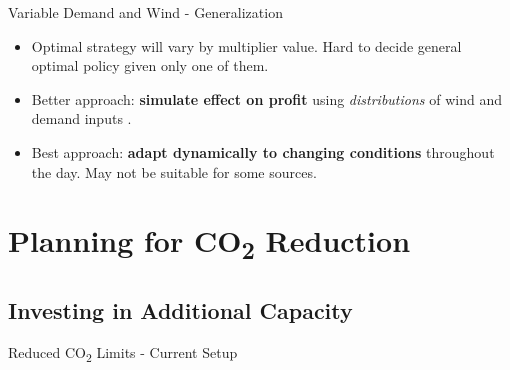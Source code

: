 \documentclass{beamer}
\begin{document}
    \begin{frame}{Variable Demand and Wind - Generalization}
    	
        	\begin{itemize}

                \item Optimal strategy will vary by multiplier value.  Hard to decide general optimal policy given only one of them.

                \item  Better approach: \textbf{simulate effect on profit} using \textit{distributions} of wind and demand inputs .

                \item Best approach: \textbf{adapt dynamically to changing conditions} throughout the day.  May not be suitable for some sources.  

			\end{itemize}   
    
    \end{frame}

    
    
    \section{Planning for CO\texorpdfstring{\textsubscript{2}}{2} Reduction}
    
    \subsection{Investing in Additional Capacity}
    
        \begin{frame}{Reduced CO\textsubscript{2} Limits - Current Setup}
    
       	\chartrampdown
        
    \end{frame}
    
\end{document}
